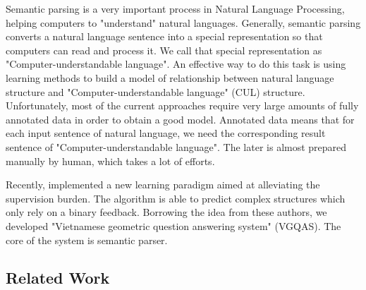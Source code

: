\label{sec:introduction}

Semantic parsing is a very important process in Natural Language Processing, helping computers to "understand" natural languages. Generally, semantic parsing converts a natural language sentence into a special representation so that computers can read and process it. We call that special representation as "Computer-understandable language". An effective way to do this task is using learning methods to build a model of relationship between natural language structure and "Computer-understandable language" (CUL) structure. Unfortunately, most of the current approaches require very large amounts of fully annotated data in order to obtain a good model. Annotated data means that for each input sentence of natural language, we need the corresponding result sentence of "Computer-understandable language". The later is almost prepared manually by human, which takes a lot of efforts. 

Recently, \citeauthor{Clarke:2010:DSP:1870568.1870571} implemented a new learning paradigm aimed at alleviating the supervision burden. The algorithm is able to predict complex structures which only rely on a binary feedback. Borrowing the idea from these authors, we developed "Vietnamese geometric question answering system" (VGQAS). The core of the system is semantic parser.

\subsection*{Related Work}

